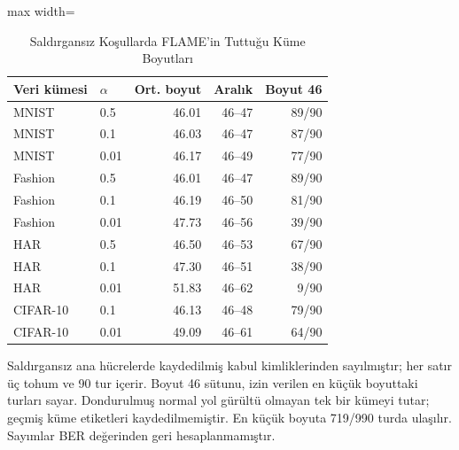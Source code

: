 \begin{table}[!t]
\centering\footnotesize
\setlength{\tabcolsep}{4pt}
\caption{Saldırgansız Koşullarda FLAME'in Tuttuğu Küme Boyutları}\label{tab:flame_sizes}
\begin{adjustbox}{max width=\columnwidth}
\begin{tabular}{llrrr}
\toprule
Veri kümesi & $\alpha$ & Ort. boyut & Aralık & Boyut 46 \\
\midrule
MNIST & 0.5 & 46.01 & 46--47 & 89/90 \\
MNIST & 0.1 & 46.03 & 46--47 & 87/90 \\
MNIST & 0.01 & 46.17 & 46--49 & 77/90 \\
Fashion & 0.5 & 46.01 & 46--47 & 89/90 \\
Fashion & 0.1 & 46.19 & 46--50 & 81/90 \\
Fashion & 0.01 & 47.73 & 46--56 & 39/90 \\
HAR & 0.5 & 46.50 & 46--53 & 67/90 \\
HAR & 0.1 & 47.30 & 46--51 & 38/90 \\
HAR & 0.01 & 51.83 & 46--62 & 9/90 \\
CIFAR-10 & 0.1 & 46.13 & 46--48 & 79/90 \\
CIFAR-10 & 0.01 & 49.09 & 46--61 & 64/90 \\
\bottomrule
\end{tabular}
\end{adjustbox}

\par\vspace{3pt}\parbox{\linewidth}{\footnotesize Saldırgansız ana hücrelerde kaydedilmiş kabul kimliklerinden sayılmıştır; her satır üç tohum ve 90 tur içerir. Boyut 46 sütunu, izin verilen en küçük boyuttaki turları sayar. Dondurulmuş normal yol gürültü olmayan tek bir kümeyi tutar; geçmiş küme etiketleri kaydedilmemiştir. En küçük boyuta 719/990 turda ulaşılır. Sayımlar BER değerinden geri hesaplanmamıştır.}
\end{table}
